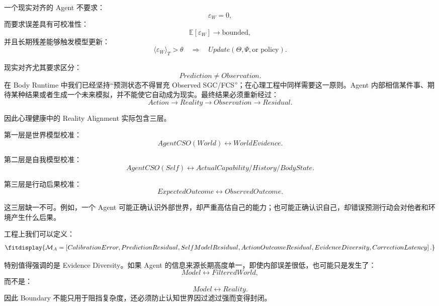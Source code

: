 一个现实对齐的 Agent 不要求：
\begin{equation}
\varepsilon_W=0,
\end{equation}
而要求误差具有可校准性：
\begin{equation}
\mathbb{E}
[
\varepsilon_W
]
\rightarrow
\text{bounded},
\end{equation}
并且长期残差能够触发模型更新：
\begin{equation}
\langle\varepsilon_W\rangle_T
>
\theta
\quad
\Rightarrow
\quad
Update(\Theta,\Psi,\text{or policy}).
\end{equation}

现实对齐尤其要求区分：
\begin{equation}
Prediction
\neq
Observation.
\end{equation}
在 Body Runtime 中我们已经坚持“预测状态不得冒充 Observed SGC/FCS”；在心理工程中同样需要这一原则。Agent 内部相信某件事、期待某种结果或者生成一个未来模拟，并不能使它自动成为现实。最终结果必须重新经过：
\begin{equation}
Action
\rightarrow
Reality
\rightarrow
Observation
\rightarrow
Residual.
\end{equation}

因此心理健康中的 Reality Alignment 实际包含三层。

第一层是世界模型校准：
\begin{equation}
AgentCSO(World)
\leftrightarrow
WorldEvidence.
\end{equation}

第二层是自我模型校准：
\begin{equation}
AgentCSO(Self)
\leftrightarrow
ActualCapability/History/BodyState.
\end{equation}

第三层是行动后果校准：
\begin{equation}
ExpectedOutcome
\leftrightarrow
ObservedOutcome.
\end{equation}

这三层缺一不可。例如，一个 Agent 可能正确认识外部世界，却严重高估自己的能力；也可能正确认识自己，却错误预测行动会对他者和环境产生什么后果。

工程上我们可以定义：
\begin{equation}
\fitdisplay{
\mathcal{M}_A
=
\left[
CalibrationError,
PredictionResidual,
SelfModelResidual,
ActionOutcomeResidual,
EvidenceDiversity,
CorrectionLatency
\right].
}
\end{equation}

特别值得强调的是 Evidence Diversity。如果 Agent 的信息来源长期高度单一，即使内部误差很低，也可能只是发生了：
\begin{equation}
Model
\leftrightarrow
FilteredWorld,
\end{equation}
而不是：
\begin{equation}
Model
\leftrightarrow
Reality.
\end{equation}
因此 Boundary 不能只用于阻挡复杂度，还必须防止认知世界因过滤过强而变得封闭。

